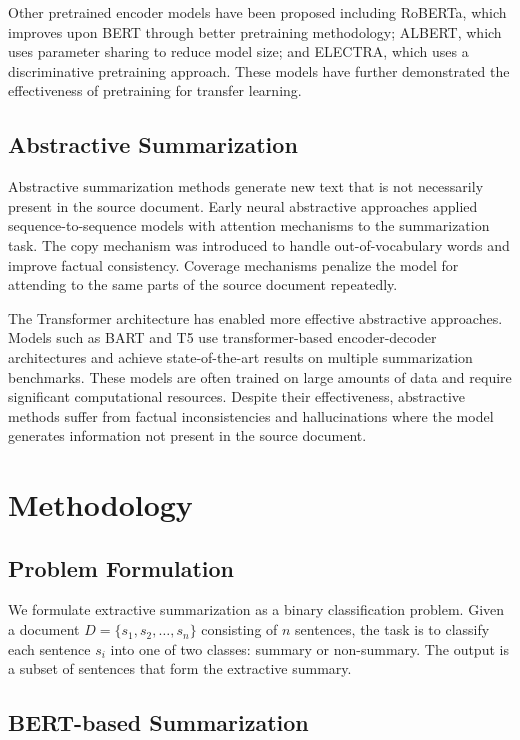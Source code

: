 \documentclass[conference]{IEEEtran}
\begin{document}
Other pretrained encoder models have been proposed including RoBERTa, which improves upon BERT through better pretraining methodology; ALBERT, which uses parameter sharing to reduce model size; and ELECTRA, which uses a discriminative pretraining approach. These models have further demonstrated the effectiveness of pretraining for transfer learning.

\subsection{Abstractive Summarization}

Abstractive summarization methods generate new text that is not necessarily present in the source document. Early neural abstractive approaches applied sequence-to-sequence models with attention mechanisms to the summarization task. The copy mechanism was introduced to handle out-of-vocabulary words and improve factual consistency. Coverage mechanisms penalize the model for attending to the same parts of the source document repeatedly.

The Transformer architecture has enabled more effective abstractive approaches. Models such as BART and T5 use transformer-based encoder-decoder architectures and achieve state-of-the-art results on multiple summarization benchmarks. These models are often trained on large amounts of data and require significant computational resources. Despite their effectiveness, abstractive methods suffer from factual inconsistencies and hallucinations where the model generates information not present in the source document.

\section{Methodology}

\subsection{Problem Formulation}

We formulate extractive summarization as a binary classification problem. Given a document $D = \{s_1, s_2, \ldots, s_n\}$ consisting of $n$ sentences, the task is to classify each sentence $s_i$ into one of two classes: summary or non-summary. The output is a subset of sentences that form the extractive summary.

\subsection{BERT-based Summarization}
\end{document}

